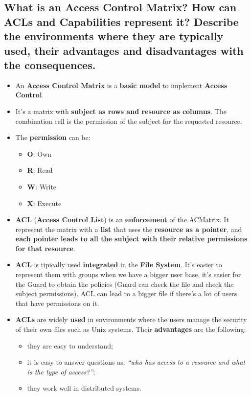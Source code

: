 \documentclass[9pt, letterpaper]{article}
\begin{document}
\subsection{What is an Access Control Matrix? How can ACLs and Capabilities represent it? Describe the environments where they are typically used, their advantages and disadvantages with the consequences.}
\begin{itemize}
	\item An \textbf{Access Control Matrix} is a \textbf{basic model} to implement \textbf{Access Control}.
	\item It's a matrix with \textbf{subject as rows and resource as columns}. The combination cell is the permission of the subject for the requested resource.
	\item The \textbf{permission} can be:
	\begin{itemize}
		\item \textbf{O}: Own
		\item \textbf{R}: Read
		\item \textbf{W}: Write
		\item \textbf{X}: Execute
	\end{itemize}
	\item \textbf{ACL} (\textbf{Access Control List}) is an \textbf{enforcement} of the ACMatrix. It represent the matrix with a \textbf{list} that uses the \textbf{resource as a pointer}, and \textbf{each pointer leads to all the subject with their relative permissions for that resource}.
	\item \textbf{ACL} is tipically used \textbf{integrated} in the \textbf{File System}. It's easier to represent them with groups when we have a bigger user base, it's easier for the Guard to obtain the policies (Guard can check the file and check the subject permissions). ACL can lead to a bigger file if there's a lot of users that have permissions on it.
	\item \textbf{ACLs} are widely \textbf{used} in environments where the users manage the security of their own files such as Unix systems. Their \textbf{advantages} are the following:
	\begin{itemize}
		\item they are easy to understand;
		\item it is easy to answer questions as: \textit{“who has access to a resource and what is the type of access?”};
		\item they work well in distributed systems.
	\end{itemize}

\end{itemize}
\end{document}
